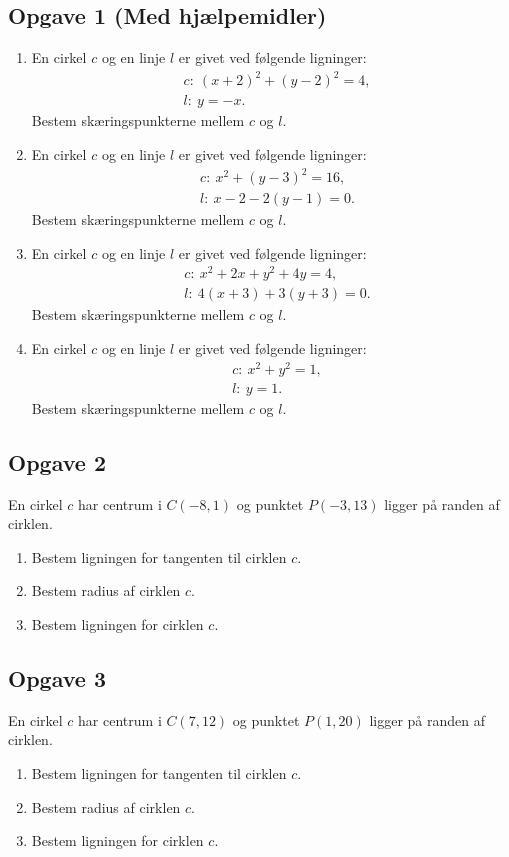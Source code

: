 \documentclass[12pt]{article}
\begin{document}
\subsection*{Opgave 1 (Med hjælpemidler)}
\begin{enumerate}[label=\roman*)]
	\item En cirkel $c$ og en linje $l$ er givet ved følgende ligninger:
	\begin{align*}
		&c: \ (x+2)^2+(y-2)^2 = 4, \\
		&l: \ y = -x.
	\end{align*}
	Bestem skæringspunkterne mellem $c$ og $l$. 
	\item En cirkel $c$ og en linje $l$ er givet ved følgende ligninger:
	\begin{align*}
		&c: \ x^2+(y-3)^2 = 16, \\
		&l: \ x-2 - 2(y-1) = 0.
	\end{align*}
	Bestem skæringspunkterne mellem $c$ og $l$. 
	\item En cirkel $c$ og en linje $l$ er givet ved følgende ligninger:
	\begin{align*}
		&c: \ x^2+2x+y^2+4y = 4, \\
		&l: \ 4(x+3)+3(y+3)=0.
	\end{align*}
	Bestem skæringspunkterne mellem $c$ og $l$. 
	\item En cirkel $c$ og en linje $l$ er givet ved følgende ligninger:
	\begin{align*}
		&c: \ x^2+y^2=1, \\
		&l: \ y=1.
	\end{align*}
	Bestem skæringspunkterne mellem $c$ og $l$.
\end{enumerate}

\subsection*{Opgave 2}
En cirkel $c$ har centrum i $C(-8,1)$ og punktet $P(-3,13)$ ligger på randen af cirklen.
\begin{enumerate}[label=\roman*)]
	\item Bestem ligningen for tangenten til cirklen $c$.
	\item Bestem radius af cirklen $c$. 
	\item Bestem ligningen for cirklen $c$. 
\end{enumerate}

\subsection*{Opgave 3}
En cirkel $c$ har centrum i $C(7,12)$ og punktet $P(1,20)$ ligger på randen af cirklen.
\begin{enumerate}[label=\roman*)]
	\item Bestem ligningen for tangenten til cirklen $c$.
	\item Bestem radius af cirklen $c$. 
	\item Bestem ligningen for cirklen $c$. 
\end{enumerate}
\end{document}
